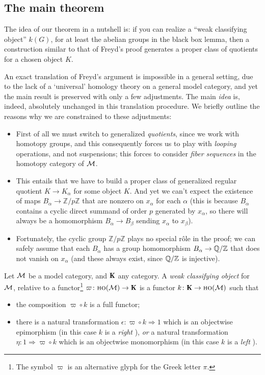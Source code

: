 \documentclass[a4paper, 10pt]{amsart}
\begin{document}
\subsection{The main theorem}
\begin{remark}
The idea of our theorem in a nutshell is: if you can realize a ``weak classifying object'' $k(G)$, for at least the abelian groups in the black box lemma, then a construction similar to that of Freyd's proof generates a proper class of quotients for a chosen object $K$.

An exact translation of Freyd's argument is impossible in a general setting, due to the lack of a `universal' homology theory on a general model category, and yet the main result is preserved with only a few adjustments. The main \emph{idea} is, indeed, absolutely unchanged in this translation procedure. We briefly outline the reasons why we are constrained to these adjustments:
\begin{itemize}
	\item First of all we must switch to generalized \emph{quotients}, since we work with homotopy groups, and this consequently forces us to play with \emph{looping} operations, and not suspensions; this forces to consider \emph{fiber sequences} in the homotopy category of $\mathcal{M}$.
	\item This entails that we have to build a proper class of generalized regular quotient $K \to K_\alpha$ for some object $K$. And yet we can't expect the existence of maps $B_\alpha \to \mathbb{Z}/p\mathbb{Z}$ that are nonzero on $x_\alpha$ for each $\alpha$ (this is because $B_\alpha$ contains a cyclic direct summand of order $p$ generated by $x_\alpha$, so there will always be a homomorphism $B_\alpha\to B_\beta$ sending $x_\alpha$ to $x_\beta$).
	\item Fortunately, the cyclic group $\mathbb{Z}/p\mathbb{Z}$ plays no special r\^ole in the proof; we can safely assume that each $B_\alpha$ has a group homomorphism $B_\alpha \to \mathbb{Q}/\mathbb{Z}$ that does not vanish on $x_\alpha$ (and these always exist, since $\mathbb{Q}/\mathbb{Z}$ is injective).
\end{itemize}
\end{remark}
\begin{definition}\label{wcodef}
Let $\mathcal{M}$ be a model category, and $\cate{K}$ any category. A \emph{weak classifying object} for $\mathcal{M}$, relative to a functor\footnote{The symbol $\varpi$ is an alternative glyph for the Greek letter $\pi$.} $\varpi \colon \ho(\M) \to \cate{K}$ is a functor $k\colon \cate{K} \to \ho(\M)$ such that
\begin{itemize}
	\item the composition $\varpi\circ k$ is a full functor;
	\item there is a natural transformation $\epsilon\colon \varpi\circ k \Rightarrow 1$ which is an objectwise epimorphism (in this case $k$ is a \emph{right} \wco), \emph{or} a natural transformation $\eta \colon 1\Rightarrow \varpi\circ k$ which is an objectwise monomorphism (in this case $k$ is a \emph{left} \wco).
\end{itemize}
\end{definition}
\end{document}

